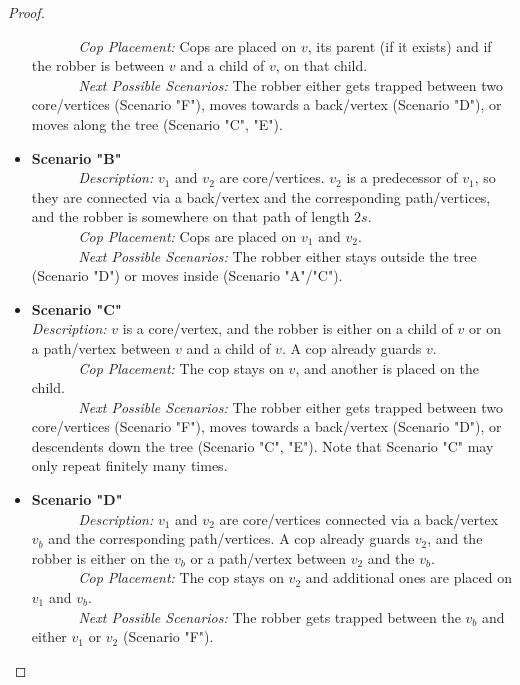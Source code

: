 \begin{proof}
\begin{itemize}
           \textit{Cop Placement:} Cops are placed on $v$, its parent (if it exists) and if the robber is between $v$ and a child of $v$, on that child.\\
           \textit{Next Possible Scenarios:} The robber either gets trapped between two core\-/vertices (Scenario "F"), moves towards a back\-/vertex (Scenario "D"), or moves along the tree (Scenario "C", "E").\\
   \item \textbf{Scenario "B"} \\
           \textit{Description:} $v_1$ and $v_2$ are core\-/vertices. $v_2$ is a predecessor of $v_1$, so they are connected via a back\-/vertex and the corresponding path\-/vertices, and the robber is somewhere on that path of length $2s$.\\
           \textit{Cop Placement:} Cops are placed on $v_1$ and $v_2$. \\
           \textit{Next Possible Scenarios:} The robber either stays outside the tree (Scenario "D") or moves inside (Scenario "A"/"C"). \\
           \item \textbf{Scenario "C"} \\
           \textit{Description:} $v$ is a core\-/vertex, and the robber is either on a child of $v$ or on a path\-/vertex between $v$ and a child of $v$. A cop already guards $v$.\\
           \textit{Cop Placement:} The cop stays on $v$, and another is placed on the child.\\
           \textit{Next Possible Scenarios:} The robber either gets trapped between two core\-/vertices (Scenario "F"), moves towards a back\-/vertex (Scenario "D"), or descendents down the tree (Scenario "C", "E"). Note that Scenario "C" may only repeat finitely many times.\\
   \item \textbf{Scenario "D"} \\
           \textit{Description:} $v_1$ and $v_2$ are core\-/vertices connected via a back\-/vertex $v_b$ and the corresponding path\-/vertices. A cop already guards $v_2$, and the robber is either on the $v_b$ or a path\-/vertex between $v_2$ and the $v_b$. \\
           \textit{Cop Placement:} The cop stays on $v_2$ and additional ones are placed on $v_1$ and $v_b$. \\
           \textit{Next Possible Scenarios:} The robber gets trapped between the $v_b$ and either $v_1$ or $v_2$ (Scenario "F").\\

\end{itemize}
\end{proof}
